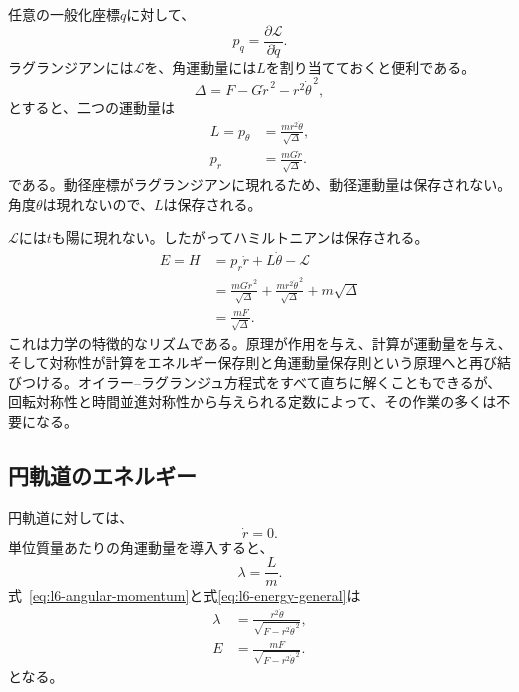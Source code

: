 任意の一般化座標\(q\)に対して、
\begin{equation}
p_q=\frac{\partial\mathcal L}{\partial\dot q}.
\end{equation}
ラグランジアンには\(\mathcal L\)を、角運動量には\(L\)を割り当てておくと便利である。
\begin{equation}
\Delta=F-G\dot r^{\,2}-r^{2}\dot\theta^{\,2},
\end{equation}
とすると、二つの運動量は
\begin{align}
L=p_\theta
&=\frac{mr^{2}\dot\theta}{\sqrt{\Delta}},
\label{eq:l6-angular-momentum}\\
p_r
&=\frac{mG\dot r}{\sqrt{\Delta}}.
\label{eq:l6-radial-momentum}
\end{align}
である。動径座標がラグランジアンに現れるため、動径運動量は保存されない。角度\(\theta\)は現れないので、\(L\)は保存される。

\(\mathcal L\)には\(t\)も陽に現れない。したがってハミルトニアンは保存される。
\begin{align}
E=H
&=p_r\dot r+L\dot\theta-\mathcal L \\
&=\frac{mG\dot r^{\,2}}{\sqrt{\Delta}}
  +\frac{mr^{2}\dot\theta^{\,2}}{\sqrt{\Delta}}
  +m\sqrt{\Delta} \\
&=\frac{mF}{\sqrt{\Delta}}.
\label{eq:l6-energy-general}
\end{align}
これは力学の特徴的なリズムである。原理が作用を与え、計算が運動量を与え、そして対称性が計算をエネルギー保存則と角運動量保存則という原理へと再び結びつける。オイラー--ラグランジュ方程式をすべて直ちに解くこともできるが、回転対称性と時間並進対称性から与えられる定数によって、その作業の多くは不要になる。

\subsection{円軌道のエネルギー}

円軌道に対しては、
\begin{equation}
\dot r=0.
\end{equation}
単位質量あたりの角運動量を導入すると、
\begin{equation}
\lambda=\frac{L}{m}.
\end{equation}
式~\eqref{eq:l6-angular-momentum}と式\eqref{eq:l6-energy-general}は
\begin{align}
\lambda
&=\frac{r^{2}\dot\theta}
{\sqrt{F-r^{2}\dot\theta^{\,2}}},
\label{eq:l6-lambda-circular}\\
E
&=\frac{mF}{\sqrt{F-r^{2}\dot\theta^{\,2}}}.
\label{eq:l6-energy-circular-first}
\end{align}
となる。

